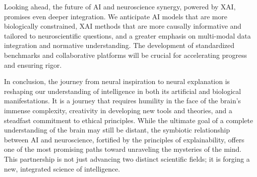 \documentclass[11pt,a4paper]{article}
\begin{document}
Looking ahead, the future of AI and neuroscience synergy, powered by XAI, promises even deeper integration. We anticipate AI models that are more biologically constrained, XAI methods that are more causally informative and tailored to neuroscientific questions, and a greater emphasis on multi-modal data integration and normative understanding. The development of standardized benchmarks and collaborative platforms will be crucial for accelerating progress and ensuring rigor.

In conclusion, the journey from neural inspiration to neural explanation is reshaping our understanding of intelligence in both its artificial and biological manifestations. It is a journey that requires humility in the face of the brain's immense complexity, creativity in developing new tools and theories, and a steadfast commitment to ethical principles. While the ultimate goal of a complete understanding of the brain may still be distant, the symbiotic relationship between AI and neuroscience, fortified by the principles of explainability, offers one of the most promising paths toward unraveling the mysteries of the mind. This partnership is not just advancing two distinct scientific fields; it is forging a new, integrated science of intelligence.

% 
\clearpage
\end{document}
